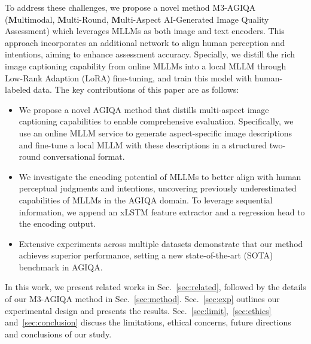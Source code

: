 To address these challenges, we propose a novel method M3-AGIQA (\textbf{M}ultimodal, \textbf{M}ulti-Round, \textbf{M}ulti-Aspect AI-Generated Image Quality Assessment) which leverages MLLMs as both image and text encoders. 
This approach incorporates an additional network to align human perception and intentions, aiming to enhance assessment accuracy. 
Specially, we distill the rich image captioning capability from online MLLMs into a local MLLM through Low-Rank Adaption (LoRA) fine-tuning, and train this model with human-labeled data. The key contributions of this paper are as follows:
\begin{itemize}
    \item We propose a novel AGIQA method that distills multi-aspect image captioning capabilities to enable comprehensive evaluation. Specifically, we use an online MLLM service to generate aspect-specific image descriptions and fine-tune a local MLLM with these descriptions in a structured two-round conversational format.
    \item We investigate the encoding potential of MLLMs to better align with human perceptual judgments and intentions, uncovering previously underestimated capabilities of MLLMs in the AGIQA domain. To leverage sequential information, we append an xLSTM feature extractor and a regression head to the encoding output.
    \item Extensive experiments across multiple datasets demonstrate that our method achieves superior performance, setting a new state-of-the-art (SOTA) benchmark in AGIQA.
\end{itemize}

In this work, we present related works in Sec.~\ref{sec:related}, followed by the details of our M3-AGIQA method in Sec.~\ref{sec:method}. Sec.~\ref{sec:exp} outlines our experimental design and presents the results. Sec.~\ref{sec:limit},~\ref{sec:ethics} and~\ref{sec:conclusion} discuss the limitations, ethical concerns, future directions and conclusions of our study.